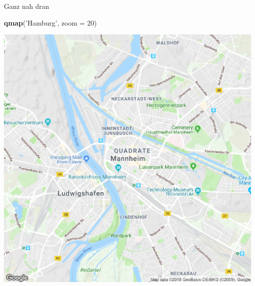 \documentclass[ignorenonframetext,]{beamer}
\newenvironment{Shaded}{\begin{snugshade}}{\end{snugshade}}
\newcommand{\DataTypeTok}[1]{\textcolor[rgb]{0.13,0.29,0.53}{#1}}
\newcommand{\DecValTok}[1]{\textcolor[rgb]{0.00,0.00,0.81}{#1}}
\newcommand{\KeywordTok}[1]{\textcolor[rgb]{0.13,0.29,0.53}{\textbf{#1}}}
\newcommand{\NormalTok}[1]{#1}
\newcommand{\StringTok}[1]{\textcolor[rgb]{0.31,0.60,0.02}{#1}}
\begin{document}
\begin{frame}[fragile]{Ganz nah dran}
\protect\hypertarget{ganz-nah-dran}{}

\begin{Shaded}
\begin{Highlighting}[]
\KeywordTok{qmap}\NormalTok{(}\StringTok{'Hamburg'}\NormalTok{, }\DataTypeTok{zoom =} \DecValTok{20}\NormalTok{)}
\end{Highlighting}
\end{Shaded}

\includegraphics{figure/ham_map_z20.pdf}

\end{frame}
\end{document}
